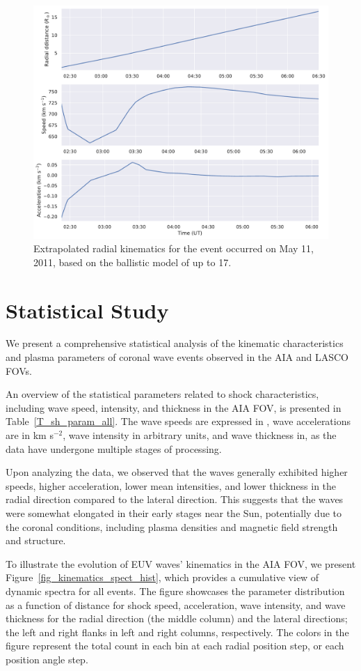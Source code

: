 \begin{figure}[!htp] %
	\centerline{\includegraphics[width=0.8\columnwidth]{chapter2/figs/radial_kinematics_aia_lasco_110511_01.pdf}}
	\caption{Extrapolated radial kinematics for the event occurred on May 11, 2011, based on the ballistic model of \cite{gallagher_2003} up to 17\rsun.}
	\label{fig_rad_kinematics_aialasco_110511}
\end{figure}

\section{Statistical Study}
We present a comprehensive statistical analysis of the kinematic characteristics and plasma parameters of coronal wave events observed in the AIA and LASCO FOVs.

An overview of the statistical parameters related to shock characteristics, including wave speed, intensity, and thickness in the AIA FOV, is presented in Table~\ref{T_sh_param_all}. The wave speeds are expressed in \kms, wave accelerations are in km s$^{-2}$, wave intensity in arbitrary units, and wave thickness in\rsun, as the data have undergone multiple stages of processing.

Upon analyzing the data, we observed that the waves generally exhibited higher speeds, higher acceleration, lower mean intensities, and lower thickness in the radial direction compared to the lateral direction. This suggests that the waves were somewhat elongated in their early stages near the Sun, potentially due to the coronal conditions, including plasma densities and magnetic field strength and structure.

To illustrate the evolution of EUV waves' kinematics in the AIA FOV, we present Figure~\ref{fig_kinematics_spect_hist}, which provides a cumulative view of dynamic spectra for all events. The figure showcases the parameter distribution as a function of distance for shock speed, acceleration, wave intensity, and wave thickness for the radial direction (the middle column) and the lateral directions; the left and right flanks in left and right columns, respectively. The colors in the figure represent the total count in each bin at each radial position step, or each position angle step.

